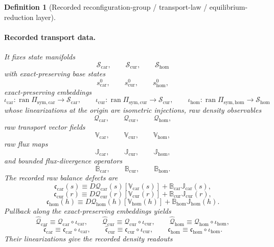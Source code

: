 \documentclass[11pt]{article}
\newcommand{\TensorSymProj}{\Pi_{\mathrm{sym,car}}}
\newcommand{\CurSymProj}{\Pi_{\mathrm{sym,cur}}}
\newcommand{\HomSymProj}{\Pi_{\mathrm{sym,hom}}}
\newcommand{\TensorPrimitiveDensity}{\widehat{\mathcal Q}_{\mathrm{car}}}
\newcommand{\CurPrimitiveDensity}{\widehat{\mathcal Q}_{\mathrm{cur}}}
\newcommand{\HomPrimitiveDensity}{\widehat{\mathcal Q}_{\mathrm{hom}}}
\newcommand{\TensorBalance}{\widehat{\mathfrak c}_{\mathrm{car}}}
\newcommand{\CurBalance}{\widehat{\mathfrak c}_{\mathrm{cur}}}
\newcommand{\HomBalance}{\widehat{\mathfrak c}_{\mathrm{hom}}}
\newcommand{\TensorStateManifold}{\mathcal S_{\mathrm{car}}}
\newcommand{\CurStateManifold}{\mathcal S_{\mathrm{cur}}}
\newcommand{\HomStateManifold}{\mathcal S_{\mathrm{hom}}}
\newcommand{\TensorStateBase}{s_{\mathrm{car}}^{0}}
\newcommand{\CurStateBase}{s_{\mathrm{cur}}^{0}}
\newcommand{\HomStateBase}{s_{\mathrm{hom}}^{0}}
\newcommand{\TensorStateEmbed}{\iota_{\mathrm{car}}}
\newcommand{\CurStateEmbed}{\iota_{\mathrm{cur}}}
\newcommand{\HomStateEmbed}{\iota_{\mathrm{hom}}}
\newcommand{\TensorRawDensity}{\boldsymbol{\mathcal Q}_{\mathrm{car}}}
\newcommand{\CurRawDensity}{\boldsymbol{\mathcal Q}_{\mathrm{cur}}}
\newcommand{\HomRawDensity}{\boldsymbol{\mathcal Q}_{\mathrm{hom}}}
\newcommand{\TensorTransport}{\mathbb V_{\mathrm{car}}}
\newcommand{\CurTransport}{\mathbb V_{\mathrm{cur}}}
\newcommand{\HomTransport}{\mathbb V_{\mathrm{hom}}}
\newcommand{\TensorFlux}{\mathbb J_{\mathrm{car}}}
\newcommand{\CurFlux}{\mathbb J_{\mathrm{cur}}}
\newcommand{\HomFlux}{\mathbb J_{\mathrm{hom}}}
\newcommand{\TensorDiv}{\mathbb B_{\mathrm{car}}}
\newcommand{\CurDiv}{\mathbb B_{\mathrm{cur}}}
\newcommand{\HomDiv}{\mathbb B_{\mathrm{hom}}}
\newcommand{\TensorRawBalance}{\boldsymbol{\mathfrak c}_{\mathrm{car}}}
\newcommand{\CurRawBalance}{\boldsymbol{\mathfrak c}_{\mathrm{cur}}}
\newcommand{\HomRawBalance}{\boldsymbol{\mathfrak c}_{\mathrm{hom}}}
\newtheorem{definition}{Definition}
\begin{document}
\begin{definition}[Recorded reconfiguration-group / transport-law / equilibrium-reduction layer]
\paragraph{Recorded transport data.}
It fixes state manifolds
\[
\TensorStateManifold,\qquad
\CurStateManifold,\qquad
\HomStateManifold
\]
with exact-preserving base states
\[
\TensorStateBase,\qquad
\CurStateBase,\qquad
\HomStateBase,
\]
exact-preserving embeddings
\[
\TensorStateEmbed:\operatorname{ran}\TensorSymProj\to\TensorStateManifold,\qquad
\CurStateEmbed:\operatorname{ran}\CurSymProj\to\CurStateManifold,\qquad
\HomStateEmbed:\operatorname{ran}\HomSymProj\to\HomStateManifold
\]
whose linearizations at the origin are isometric injections, raw density observables
\[
\TensorRawDensity,\qquad
\CurRawDensity,\qquad
\HomRawDensity,
\]
raw transport vector fields
\[
\TensorTransport,\qquad
\CurTransport,\qquad
\HomTransport,
\]
raw flux maps
\[
\TensorFlux,\qquad
\CurFlux,\qquad
\HomFlux,
\]
and bounded flux-divergence operators
\[
\TensorDiv,\qquad
\CurDiv,\qquad
\HomDiv.
\]
The recorded raw balance defects are
\begin{equation}
\TensorRawBalance(s)
\equiv
D\TensorRawDensity(s)[\TensorTransport(s)]
+\TensorDiv\TensorFlux(s),
\label{eq:recorded_raw_balance_car}
\end{equation}
\begin{equation}
\CurRawBalance(r)
\equiv
D\CurRawDensity(r)[\CurTransport(r)]
+\CurDiv\CurFlux(r),
\label{eq:recorded_raw_balance_cur}
\end{equation}
\begin{equation}
\HomRawBalance(h)
\equiv
D\HomRawDensity(h)[\HomTransport(h)]
+\HomDiv\HomFlux(h).
\label{eq:recorded_raw_balance_hom}
\end{equation}
Pullback along the exact-preserving embeddings yields
\begin{equation}
\TensorPrimitiveDensity\equiv\TensorRawDensity\circ\TensorStateEmbed,\qquad
\CurPrimitiveDensity\equiv\CurRawDensity\circ\CurStateEmbed,\qquad
\HomPrimitiveDensity\equiv\HomRawDensity\circ\HomStateEmbed,
\label{eq:recorded_primitive_density}
\end{equation}
\begin{equation}
\TensorBalance\equiv\TensorRawBalance\circ\TensorStateEmbed,\qquad
\CurBalance\equiv\CurRawBalance\circ\CurStateEmbed,\qquad
\HomBalance\equiv\HomRawBalance\circ\HomStateEmbed.
\label{eq:recorded_primitive_balance}
\end{equation}
Their linearizations give the recorded density readouts
\begin{equation}

\end{equation}
\end{definition}
\end{document}
